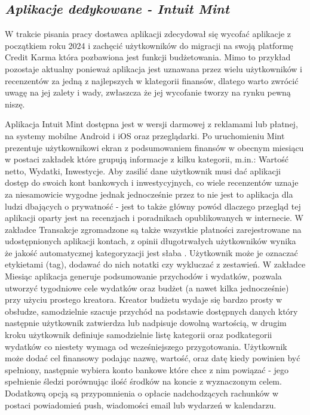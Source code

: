 \documentclass[a4paper,10pt, twoside]{report}
\newcommand{\customstylesection}[1]{\textbf{\textit{#1}}}
\begin{document}
\begin{large}
\section{\customstylesection{Aplikacje dedykowane - Intuit Mint}}
{W trakcie pisania pracy dostawca aplikacji zdecydował się wycofać aplikacje z 
początkiem roku 2024 i zachęcić użytkowników do migracji na swoją platformę 
Credit Karma \cite{mintwycofanie} która pozbawiona jest funkcji budżetowania. 
Mimo to przykład pozostaje aktualny ponieważ aplikacja jest uznawana przez wielu
 użytkowników i recenzentów za jedną z najlepszych w klategorii finansów, 
dlatego warto zwrócić uwagę na jej zalety i wady, zwłaszcza że jej wycofanie 
tworzy na rynku pewną niszę.}


{Aplikacja Intuit Mint \cite{mint}\cite{mintrecenzja} dostępna jest w wersji 
darmowej z reklamami lub płatnej, na systemy mobilne Android i iOS oraz 
przeglądarki. Po uruchomieniu Mint prezentuje użytkownikowi ekran z 
podsumowaniem finansów w obecnym miesiącu w postaci zakładek które grupują 
informacje z kilku kategorii, m.in.: Wartość netto, Wydatki, Inwestycje. Aby 
zasilić dane użytkownik musi dać aplikacji dostęp do swoich kont bankowych i 
inwestycyjnych, co wiele recenzentów uznaje za niesamowicie wygodne jednak 
jednocześnie przez to nie jest to aplikacja dla ludzi dbających o prywatność - 
jest to także główny powód dlaczego przegląd tej aplikacji oparty jest na 
recenzjach i poradnikach opublikowanych w internecie. W zakładce Transakcje 
zgromadzone są także wszystkie płatności zarejestrowane na udostępnionych 
aplikacji kontach, z opinii długotrwałych użytkowników wynika że jakość 
automatycznej kategoryzacji jest słaba \cite{porownanieaplikacji1}
\cite{porownanieaplikacji2}\cite{porownanieaplikacji3}
\cite{porownanieaplikacji4}\cite{porownanieaplikacji5}. Użytkownik może je 
oznaczać etykietami (tag), dodawać do nich notatki czy wykluczać z zestawień. 
W zakładce Miesiąc aplikacja generuje podsumowanie przychodów i wydatków, 
pozwala utworzyć tygodniowe cele wydatków oraz budżet (a nawet kilka 
jednocześnie) przy użyciu prostego kreatora. Kreator budżetu wydaje się bardzo 
prosty w obsłudze, samodzielnie szacuje przychód na podstawie dostępnych danych 
który następnie użytkownik zatwierdza lub nadpisuje dowolną wartością, w drugim 
kroku użytkownik definiuje samodzielnie listę kategorii oraz podkategorii 
wydatków co niestety wymaga od wcześniejszego przygotowania. Użytkownik może 
dodać cel finansowy podając nazwę, wartość, oraz datę kiedy powinien być 
spełniony, następnie wybiera konto bankowe które chce z nim powiązać - jego 
spełnienie śledzi porównując ilość środków na koncie z wyznaczonym celem. 
Dodatkową opcją są przypomnienia o opłacie nadchodzących rachunków w postaci 
powiadomień push, wiadomości email lub wydarzeń w kalendarzu.}


\end{large}
\end{document}
